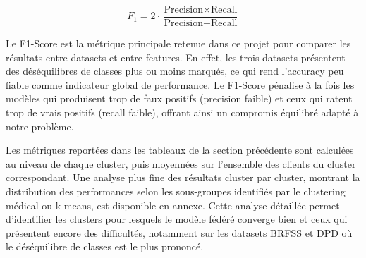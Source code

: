 \documentclass[12pt,a4paper]{article}
\begin{document}
\begin{equation}
F_1 = 2 \cdot \frac{\text{Precision} \times \text{Recall}}{\text{Precision} + \text{Recall}}
\end{equation}

Le F1-Score est la métrique principale retenue dans ce projet pour comparer les résultats entre datasets et entre features. En effet, les trois datasets présentent des déséquilibres de classes plus ou moins marqués, ce qui rend l'accuracy peu fiable comme indicateur global de performance. Le F1-Score pénalise à la fois les modèles qui produisent trop de faux positifs (precision faible) et ceux qui ratent trop de vrais positifs (recall faible), offrant ainsi un compromis équilibré adapté à notre problème.

Les métriques reportées dans les tableaux de la section précédente sont calculées au niveau de chaque cluster, puis moyennées sur l'ensemble des clients du cluster correspondant. Une analyse plus fine des résultats cluster par cluster, montrant la distribution des performances selon les sous-groupes identifiés par le clustering médical ou k-means, est disponible en annexe. Cette analyse détaillée permet d'identifier les clusters pour lesquels le modèle fédéré converge bien et ceux qui présentent encore des difficultés, notamment sur les datasets BRFSS et DPD où le déséquilibre de classes est le plus prononcé.
\end{document}
